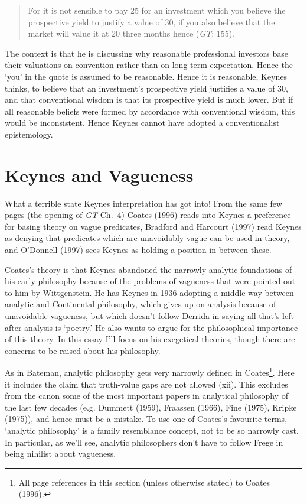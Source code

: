 \documentclass[noflushend]{philosophersimprint}
\begin{document}
\begin{quote}
For it is not sensible to pay 25 for an investment which you believe the
prospective yield to justify a value of 30, if you also believe that the
market will value it at 20 three months hence (\emph{GT}: 155).
\end{quote}

The context is that he is discussing why reasonable professional
investors base their valuations on convention rather than on long-term
expectation. Hence the `you' in the quote is assumed to be reasonable.
Hence it is reasonable, Keynes thinks, to believe that an investment's
prospective yield justifies a value of 30, and that conventional wisdom
is that its prospective yield is much lower. But if all reasonable
beliefs were formed by accordance with conventional wisdom, this would
be inconsistent. Hence Keynes cannot have adopted a conventionalist
epistemology.

\hypertarget{keynes-and-vagueness}{%
\section{Keynes and Vagueness}\label{keynes-and-vagueness}}

What a terrible state Keynes interpretation has got into! From the same
few pages (the opening of \emph{GT} Ch.~4) Coates (1996) reads into
Keynes a preference for basing theory on vague predicates, Bradford and
Harcourt (1997) read Keynes as denying that predicates which are
unavoidably vague can be used in theory, and O'Donnell (1997) sees
Keynes as holding a position in between these.

Coates's theory is that Keynes abandoned the narrowly analytic
foundations of his early philosophy because of the problems of vagueness
that were pointed out to him by Wittgenstein. He has Keynes in 1936
adopting a middle way between analytic and Continental philosophy, which
gives up on analysis because of unavoidable vagueness, but which doesn't
follow Derrida in saying all that's left after analysis is `poetry.' He
also wants to argue for the philosophical importance of this theory. In
this essay I'll focus on his exegetical theories, though there are
concerns to be raised about his philosophy.

As in Bateman, analytic philosophy gets very narrowly defined in
Coates\footnote{All page references in this section (unless otherwise
  stated) to Coates (1996).}. Here it includes the claim that
truth-value gaps are not allowed (xii). This excludes from the canon
some of the most important papers in analytical philosophy of the last
few decades (e.g. Dummett (1959), Fraassen (1966), Fine (1975), Kripke
(1975)), and hence must be a mistake. To use one of Coates's favourite
terms, `analytic philosophy' is a family resemblance concept, not to be
so narrowly cast. In particular, as we'll see, analytic philosophers
don't have to follow Frege in being nihilist about vagueness.
\end{document}
